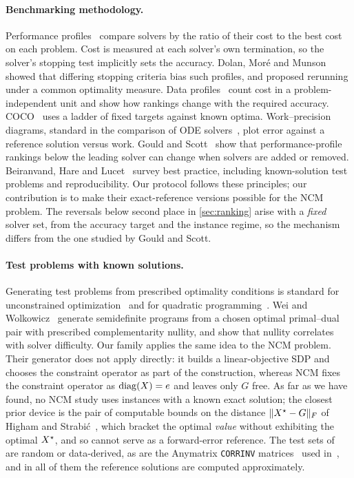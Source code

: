 \paragraph{Benchmarking methodology.}
Performance profiles~\cite{dolan2002benchmarking} compare solvers by the ratio
of their cost to the best cost on each problem. Cost is measured at each
solver's own termination, so the solver's stopping test implicitly sets the
accuracy. Dolan, Mor\'e and Munson~\cite{dolan2006optimality} showed that
differing stopping criteria bias such profiles, and proposed rerunning under a
common optimality measure. Data profiles~\cite{more2009benchmarking} count
cost in a problem-independent unit and show how rankings change with the
required accuracy. COCO~\cite{hansen2021coco} uses a ladder of fixed targets
against known optima. Work--precision diagrams, standard in the comparison of
ODE solvers~\cite{hairer1996solving}, plot error against a reference solution
versus work. Gould and Scott~\cite{gould2016note} show that performance-profile
rankings below the leading solver can change when solvers are added or
removed. Beiranvand, Hare and Lucet~\cite{beiranvand2017best} survey best
practice, including known-solution test problems and reproducibility. Our
protocol follows these principles; our contribution is to make their
exact-reference versions possible for the NCM problem. The reversals below
second place in \cref{sec:ranking} arise with a \emph{fixed} solver set, from the
accuracy target and the instance regime, so the mechanism differs from the one
studied by Gould and Scott.

\paragraph{Test problems with known solutions.}
Generating test problems from prescribed optimality conditions is standard
for unconstrained optimization~\cite{more1981testing} and for quadratic
programming~\cite{lenard1984randomly,calamai1993new}. Wei and
Wolkowicz~\cite{wei2010generating} generate semidefinite programs from a
chosen optimal primal--dual pair with prescribed complementarity nullity, and
show that nullity correlates with solver difficulty. Our family applies the
same idea to the NCM problem. Their generator does not apply directly: it
builds a linear-objective SDP and chooses the constraint operator as part of
the construction, whereas NCM fixes the constraint operator as $\operatorname{diag}(X)=e$
and leaves only $G$ free. As far as we have found, no NCM study uses
instances with a known exact solution; the closest prior device is the pair of
computable bounds on the distance $\lVert X^\star-G\rVert_F$ of Higham and
Strabi\'c~\cite{higham2016bounds}, which bracket the optimal \emph{value}
without exhibiting the optimal $X^\star$, and so cannot serve as a forward-error
reference. The test sets
of~\cite{higham2002nearest,qisun2006quadratically,borsdorf2007newton,borsdorf2010preconditioned,higham2016anderson,armijo2025semismooth}
are random or data-derived, as are the Anymatrix \texttt{CORRINV}
matrices~\cite{higham2022anymatrix} used in~\cite{huynh2025accelerated}, and
in all of them the reference solutions are computed approximately.

